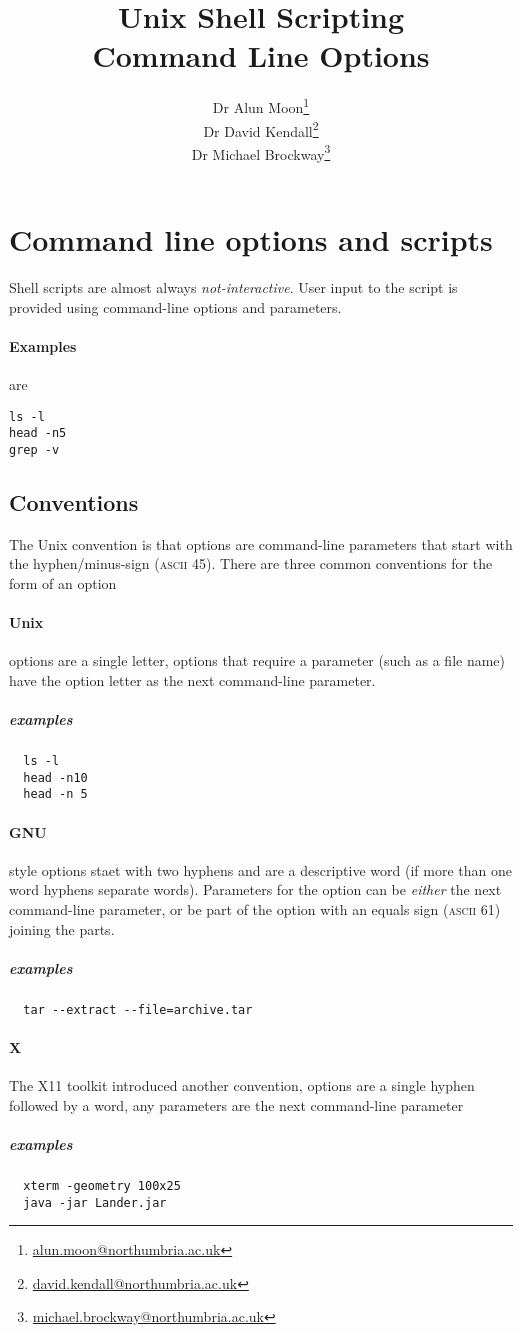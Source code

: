 \documentclass{article}
\title{Unix Shell Scripting \\ Command Line Options}
\author{%
Dr Alun Moon\thanks{\url{alun.moon@northumbria.ac.uk}}\\
Dr David Kendall\thanks{\url{david.kendall@northumbria.ac.uk}}\\
Dr Michael Brockway\thanks{\url{michael.brockway@northumbria.ac.uk}}
}
\begin{document}
\maketitle
\newpage
\section{Command line options and scripts}
Shell scripts are almost always \emph{not-interactive}.
User input to the script is provided using command-line options and parameters.

\paragraph{Examples} are
\begin{verbatim}
ls -l
head -n5
grep -v
\end{verbatim}

\subsection{Conventions}
The Unix convention is that options are command-line parameters that start with the hyphen/minus-sign (\textsc{ascii} 45).  There are three common conventions for the form of an option

\paragraph{Unix} options are a single letter, options that require a parameter (such as a file name) have the option letter as the next command-line parameter.
\subparagraph{examples}
\begin{verbatim}
  ls -l
  head -n10
  head -n 5
\end{verbatim}

\paragraph{GNU} style options staet with two hyphens and are a descriptive word (if more than one word hyphens separate words).  Parameters for the option can be \emph{either} the next command-line parameter, or be part of the option with an equals sign (\textsc{ascii} 61) joining the parts.
\subparagraph{examples}
\begin{verbatim}
  tar --extract --file=archive.tar
\end{verbatim}

\paragraph{X} The X11 toolkit introduced another convention, options are a single hyphen followed by a word, any parameters are the next command-line parameter
\subparagraph{examples}
\begin{verbatim}
  xterm -geometry 100x25
  java -jar Lander.jar
\end{verbatim}
\end{document}
